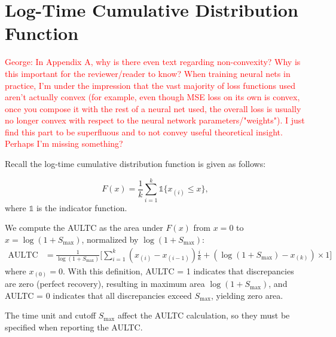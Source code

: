\section{Log-Time Cumulative Distribution Function}
\label{apd:ltcdf}
\textcolor{red}{George: In Appendix A, why is there even text regarding non-convexity? Why is this important for the reviewer/reader to know? When training neural nets in practice, I'm under the impression that the vast majority of loss functions used aren't actually convex (for example, even though MSE loss on its own is convex, once you compose it with the rest of a neural net used, the overall loss is usually no longer convex with respect to the neural network parameters/"weights"). I just find this part to be superfluous and to not convey useful theoretical insight. Perhaps I'm missing something?}

Recall the log-time cumulative distribution function is given as follows:

\[
   F(x) = \frac{1}{k} \sum_{i=1}^k \mathds{1}\{x_{(i)} \leq x\},
\]
where $\mathds{1}$ is the indicator function.

We compute the AULTC as the area under $F(x)$ from $x = 0$ to $x = \log(1 + S_{\text{max}})$, normalized by $\log(1 + S_{\text{max}})$:
\begin{align*}
\text{AULTC} &= \frac{1}{\log(1 + S_{\text{max}})} \Bigg[ \sum_{i=1}^k (x_{(i)} - x_{(i-1)}) \frac{i}{k} + (\log(1 + S_{\text{max}}) - x_{(k)}) \times 1 \Bigg]
\end{align*}
where $x_{(0)} = 0$. With this definition, AULTC = 1 indicates that discrepancies are zero (perfect recovery), resulting in maximum area $\log(1 + S_{\text{max}})$, and AULTC = 0 indicates that all discrepancies exceed $S_{\text{max}}$, yielding zero area. 


\begin{remark}
The time unit and cutoff $S_\text{max}$ affect the AULTC calculation, so they must be specified when reporting the AULTC.
\end{remark}


